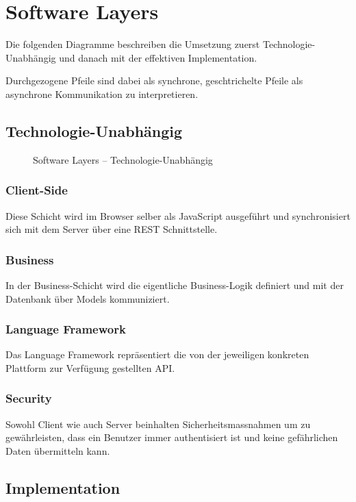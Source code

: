 \section{Software Layers}

Die folgenden Diagramme beschreiben die Umsetzung zuerst Technologie-Unabhängig und danach mit der effektiven Implementation.

Durchgezogene Pfeile sind dabei als synchrone, geschtrichelte Pfeile als asynchrone Kommunikation zu interpretieren.

\subsection*{Technologie-Unabhängig}

\begin{figure}[ht!]
	\centering{
		
	}

	\caption{Software Layers -- Technologie-Unabhängig}
\end{figure}

\subsubsection*{Client-Side}
Diese Schicht wird im Browser selber als JavaScript ausgeführt und synchronisiert sich mit dem Server über eine REST Schnittstelle.

\subsubsection*{Business}
In der Business-Schicht wird die eigentliche Business-Logik definiert und mit der Datenbank über Models kommuniziert.

\subsubsection*{Language Framework}
Das Language Framework repräsentiert die von der jeweiligen konkreten Plattform zur Verfügung gestellten API.

\subsubsection*{Security}
Sowohl Client wie auch Server beinhalten Sicherheitsmassnahmen um zu gewährleisten, dass ein \gls{Benutzer} immer authentisiert ist und keine gefährlichen Daten übermitteln kann.

\newpage
\subsection*{Implementation}

